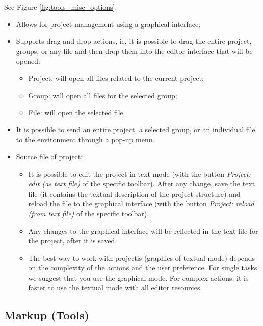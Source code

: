 See Figure \ref{fig:tools_misc_options}.

\begin{itemize}
  \item Allows for project management using a graphical interface;
  \item Supports drag and drop actions, ie, it is possible to drag
    the entire project, groups, or any file and then drop them
    into the editor interface that will be opened:
    \begin{itemize}
      \item Project: will open all files related to the current project;
      \item Group: will open all files for the selected group;
      \item File: will open the selected file.
    \end{itemize}
  \item It is possible to send an entire project,
    a selected group, or an individual file to the \RR{} environment through a pop-up menu.
  \item  Source file of project:
    \begin{itemize}
      \item It is possible to edit the project in text mode (with the button
        \textit{Project: edit (as text file)} of the specific toolbar).
        After any change, save the text file (it contains the textual
        description of the project structure) and reload the file to the
        graphical interface (with the button \textit{Project:
          reload (from text file)} of the specific toolbar).
      \item Any changes to the graphical interface will be reflected in the
        text file for the project, after it is saved.
      \item The best way to work with projectis (graphics of textual mode)
        depends on the complexity of the actions and the user preference.
        For single tasks, we suggest that you use the graphical mode.
        For complex actions, it is faster to use the textual mode with
        all editor resources.
    \end{itemize}
\end{itemize}


\hypertarget{working_tools_markup}{}
\subsection{Markup (Tools)}

